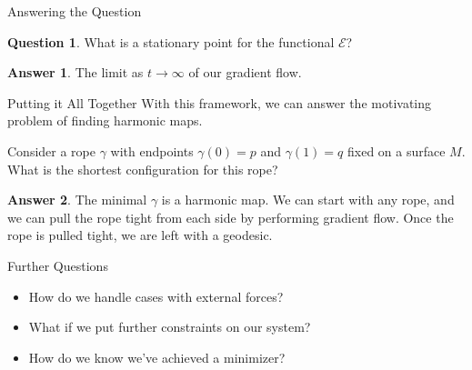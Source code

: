 \documentclass[usenames,dvipsnames]{beamer}
\theoremstyle{definition}
\newtheorem*{question}{Question}
\newtheorem*{answer}{Answer}
\theoremstyle{theorem}
\begin{document}
        \begin{frame}{Answering the Question}
            \begin{question}
            What is a stationary point for the functional $\mathcal{E}$?
            \end{question}
            \pause
            \begin{answer}
            The limit as $t\to \infty$ of our gradient flow.
            \end{answer}
        \end{frame}
        
        \begin{frame}{Putting it All Together}
            With this framework, we can answer the motivating problem of finding harmonic maps. 
            \pause            
            \begin{problem}[Geodesics]
            Consider a rope $\gamma$ with endpoints $\gamma(0)=p$ and $\gamma(1)=q$ fixed on a surface $M$.  What is the shortest configuration for this rope?
            \end{problem}
            \pause
            \begin{answer}
            The minimal $\gamma$ is a harmonic map.  We can start with any rope, and we can pull the rope tight from each side by performing gradient flow.  Once the rope is pulled tight, we are left with a geodesic.
            \end{answer}
        \end{frame}
        
        \begin{frame}{Further Questions}
            \begin{itemize}
                \item How do we handle cases with external forces?
                \item What if we put further constraints on our system?
                \item How do we know we've achieved a minimizer?
            \end{itemize}
        \end{frame}
        
        
\end{document}
